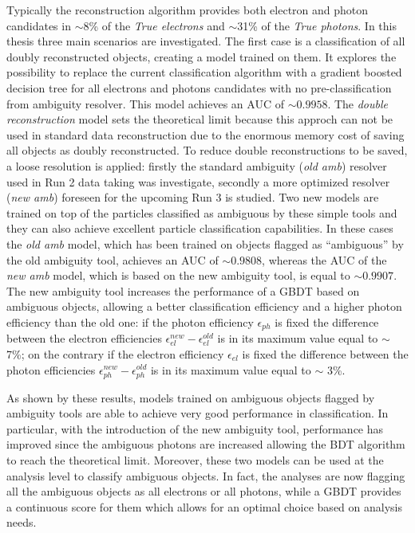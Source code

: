 \documentclass[a4paper, oneside, 11pt]{book}
\begin{document}
	Typically the reconstruction algorithm provides both electron and photon candidates in $\sim$8\% of the \textit{True electrons} and $\sim$31\% of the \textit{True photons}. In this thesis three main scenarios are investigated. The first case is a classification of all doubly reconstructed objects, creating a model trained on them. It explores the possibility to replace the current classification algorithm with a gradient boosted decision tree for all electrons and photons candidates with no pre-classification from ambiguity resolver. This model achieves an AUC of $\sim0.9958$. The \textit{double reconstruction} model sets the theoretical limit because this approch can not be used in standard data reconstruction due to the enormous memory cost of saving all objects as doubly reconstructed. To reduce double reconstructions to be saved, a loose resolution is applied: firstly the standard ambiguity (\textit{old amb}) resolver used in Run 2 data taking was investigate, secondly a more optimized resolver (\textit{new amb}) foreseen for the upcoming Run 3 is studied. Two new models are trained on top of the particles classified as ambiguous by these simple tools and they can also achieve excellent particle classification capabilities. In these cases the \textit{old amb} model, which has been trained on objects flagged as “ambiguous” by the old ambiguity tool, achieves an AUC of $\sim0.9808$, whereas the AUC of the \textit{new amb} model, which is based on the new ambiguity tool, is equal to $\sim0.9907$. The new ambiguity tool increases the performance of a GBDT based on ambiguous objects, allowing a better classification efficiency and a higher photon efficiency than the old one: if the photon efficiency $\epsilon_{ph}$ is fixed the difference between the electron efficiencies $\epsilon_{el}^{new} - \epsilon_{el}^{old}$ is in its maximum value equal to $\sim$ 7\%; on the contrary if the electron efficiency $\epsilon_{el}$ is fixed the difference between the photon efficiencies $\epsilon_{ph}^{new} - \epsilon_{ph}^{old}$ is in its maximum value equal to $\sim$ 3\%.

	As shown by these results, models trained on ambiguous objects flagged by ambiguity tools are able to achieve very good performance in classification. In particular, with the introduction of the new ambiguity tool, performance has improved since the ambiguous photons are increased allowing the BDT algorithm to reach the theoretical limit. Moreover, these two models can be used at the analysis level to classify ambiguous objects. In fact, the analyses are now flagging all the ambiguous objects as all electrons or all photons, while a GBDT provides a continuous score for them which allows for an optimal choice based on analysis needs.
	
\end{document}
